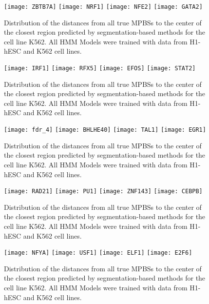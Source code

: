 \documentclass[11pt,a4]{article}
\begin{document}
\begin{figure}[h]
\centering
    \texttt{[image: ZBTB7A]}
    \texttt{[image: NRF1]}
    \texttt{[image: NFE2]}
    \texttt{[image: GATA2]}
\caption{Distribution of the distances from all true MPBSs to the center of the closest region predicted by segmentation-based methods for the cell line K562. All HMM Models were trained with data from H1-hESC and K562 cell lines.}
\label{fig:boxplot.K562.fdr_4.11}
\end{figure}

\begin{figure}[h]
\centering
    \texttt{[image: IRF1]}
    \texttt{[image: RFX5]}
    \texttt{[image: EFOS]}
    \texttt{[image: STAT2]}
\caption{Distribution of the distances from all true MPBSs to the center of the closest region predicted by segmentation-based methods for the cell line K562. All HMM Models were trained with data from H1-hESC and K562 cell lines.}
\label{fig:boxplot.K562.fdr_4.12}
\end{figure}

\begin{figure}[h]
\centering
    \texttt{[image: fdr\_4]}
    \texttt{[image: BHLHE40]}
    \texttt{[image: TAL1]}
    \texttt{[image: EGR1]}
\caption{Distribution of the distances from all true MPBSs to the center of the closest region predicted by segmentation-based methods for the cell line K562. All HMM Models were trained with data from H1-hESC and K562 cell lines.}
\label{fig:boxplot.K562.fdr_4.13}
\end{figure}

\begin{figure}[h]
\centering
    \texttt{[image: RAD21]}
    \texttt{[image: PU1]}
    \texttt{[image: ZNF143]}
    \texttt{[image: CEBPB]}
\caption{Distribution of the distances from all true MPBSs to the center of the closest region predicted by segmentation-based methods for the cell line K562. All HMM Models were trained with data from H1-hESC and K562 cell lines.}
\label{fig:boxplot.K562.fdr_4.14}
\end{figure}

\begin{figure}[h]
\centering
    \texttt{[image: NFYA]}
    \texttt{[image: USF1]}
    \texttt{[image: ELF1]}
    \texttt{[image: E2F6]}
\caption{Distribution of the distances from all true MPBSs to the center of the closest region predicted by segmentation-based methods for the cell line K562. All HMM Models were trained with data from H1-hESC and K562 cell lines.}
\label{fig:boxplot.K562.fdr_4.15}
\end{figure}
\end{document}
